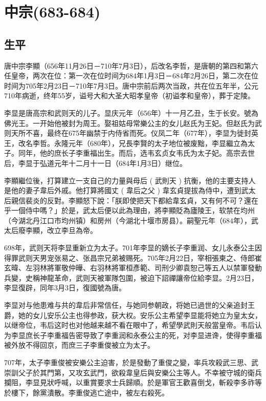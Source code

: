 
\section{中宗\tiny(683-684)}

\subsection{生平}

唐中宗李顯（656年11月26日－710年7月3日），后改名李哲，是唐朝的第四和第六任皇帝，两次在位：第一次在位时间为684年1月3日－684年2月26日，第二次在位时间为705年2月23日－710年7月3日。唐中宗前后两次当政，共在位五年半，公元710年病逝，终年55岁，谥号大和大圣大昭孝皇帝（初谥孝和皇帝），葬于定陵。

李显是唐高宗和武则天的儿子。显庆元年（656年）十一月乙丑，生于长安。號為佛光王。一开始他被封为周王。娶祖姑母常樂公主的女儿赵氏为王妃。但赵氏为武则天所不喜，最终在675年幽禁于内侍省而死。仪凤二年（677年），李显为徙封英王，改名李哲。永隆元年（680年），兄長李賢的太子地位被废黜，李显繼立為太子。同年，他的庶长子李重福出生。而后，选韦玄贞女韦氏为太子妃。高宗去世后，李显于弘道元年十二月十一日（684年1月3日）继位。

李顯繼位後，打算建立一支自己的力量與母后 ( 武則天 ) 抗衡，他的主要支持人是他的妻子韋后外戚。他打算將國丈 ( 韋后之父 ) 韋玄貞提拔為侍中，遭到武太后親信裴炎的反對。李顯怒下說：「朕即使把天下都給韋玄貞，又有何不可？還在乎一個侍中嗎？」於是，武太后便以此為理由，將李顯貶為廬陵王，软禁在均州（今湖北丹江口市均州镇）和房州（今湖北十堰市房县）。嗣聖元年（684年），武太后廢李顯，改立李旦為帝。

698年，武则天将李显重新立为太子。701年李显的嫡长子李重润、女儿永泰公主因得罪武则天男宠张易之、张昌宗兄弟被赐死。705年2月22日，宰相張柬之、侍郎崔玄暐、左羽林將軍敬仲曄、右羽林將軍桓彥範、司刑少卿袁恕己等五人以禁軍發動兵變，史稱神龍革命，武则天被軍隊包圍，被迫下詔禪讓帝位給李显。2月23日，李显復辟，同年3月3日，復國號為唐。

李显对与他患难与共的韋后非常信任，与她同参朝政，将她已過世的父亲追封王爵，她的女儿安乐公主也得参政，获大权。安乐公主希望李显能将她立为皇太女，以继帝位，韦后这时也对他越来越不看在眼中了，希望學武則天般當皇帝。韦后认为李显庶长子李重福告密导致了李重润和永泰公主的死，对李显进谗，使得李重福被外放不得回京，而庶三子李重俊被立为太子。

707年，太子李重俊被安樂公主迫害，於是發動了重俊之變，率兵攻殺武三思、武崇訓父子於其門第，又攻玄武門，欲殺韋皇后與安樂公主等人。不幸被守城的衛兵攔阻，李显見狀呼喊，以重賞要求士兵歸順。於是軍官王歡喜倒戈，斬殺李多祚等於樓下，餘黨潰散。李重俊逃亡途中，被左右殺死。

